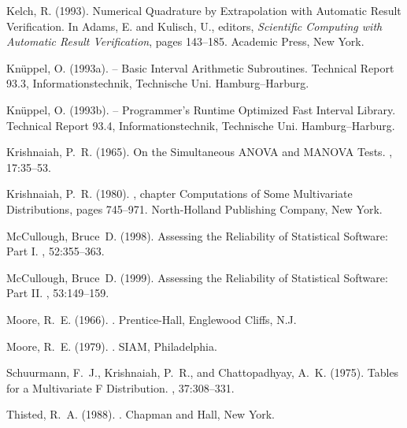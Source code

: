 \documentclass[10pt,letterpaper]{article}
\begin{document}
\begin{thebibliography}{}
Kelch, R. (1993).
\newblock Numerical {Q}uadrature by {E}xtrapolation with {A}utomatic {R}esult
  {V}erification.
\newblock In Adams, E. and Kulisch, U., editors, {\em Scientific {C}omputing
  with {A}utomatic {R}esult {V}erification}, pages 143--185. Academic Press,
  New York.

{Kn\"uppel}, O. (1993a).
 -- {B}asic {I}nterval {A}rithmetic {S}ubroutines.
\newblock Technical Report 93.3, Informationstechnik, Technische Uni.
  Hamburg--Harburg.

{Kn\"uppel}, O. (1993b).
 -- {P}rogrammer's {R}untime {O}ptimized {F}ast {I}nterval
  {L}ibrary.
\newblock Technical Report 93.4, Informationstechnik, Technische Uni.
  Hamburg--Harburg.

Krishnaiah, P.~R. (1965).
\newblock On the {S}imultaneous {ANOVA} and {MANOVA} {T}ests.
, 17:35--53.

Krishnaiah, P.~R. (1980).
, chapter Computations of Some
  Multivariate Distributions, pages 745--971.
\newblock North-Holland Publishing Company, New York.

McCullough, Bruce~D. (1998).
\newblock Assessing the Reliability of Statistical Software: Part I.
, 52:355--363.

McCullough, Bruce~D. (1999).
\newblock Assessing the Reliability of Statistical Software: Part II.
, 53:149--159.

Moore, R.~E. (1966).
.
\newblock Prentice-Hall, Englewood Cliffs, N.J.

Moore, R.~E. (1979).
.
\newblock SIAM, Philadelphia.

Schuurmann, F.~J., Krishnaiah, P.~R., and Chattopadhyay, A.~K. (1975).
\newblock Tables for a {M}ultivariate {F} {D}istribution.
, 37:308--331.

Thisted, R.~A. (1988).
.
\newblock Chapman and Hall, New York.


\end{thebibliography}
\end{document}
